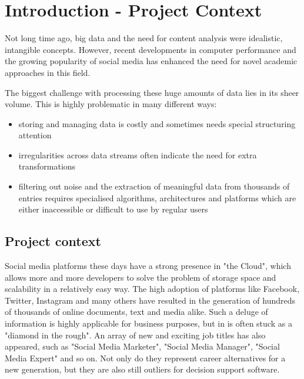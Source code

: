 \documentclass[12pt,a4paper,twoside]{report}
\begin{document}
\newpage

\tableofcontents
\newpage



\chapter{Introduction - Project Context}
\pagestyle{headings}

Not long time ago, big data and the need for content analysis were idealistic, intangible concepts. However, recent developments in computer performance and the growing popularity of social media has enhanced the need for novel academic approaches in this field.

The biggest challenge with processing these huge amounts of data lies in its sheer volume. This is highly problematic in many different ways:

\begin{itemize}
 \item storing and managing data is costly and sometimes needs special structuring attention
\item irregularities across data streams often indicate the need for extra transformations
\item filtering out noise and the extraction of meaningful data from thousands of entries requires specialised algorithms, architectures and platforms which are either inaccessible or difficult to use by regular users
\end{itemize}

\section{Project context}

Social media platforms these days have a strong presence in "the Cloud", which allows more and more developers to solve the problem of storage space and scalability in a relatively easy way. The high adoption of platforms like Facebook, Twitter, Instagram and many others have resulted in the generation of hundreds of thousands of online documents, text and media alike. Such a deluge of information is highly applicable for business purposes, but in is often stuck as a "diamond in the rough". An array of new and exciting job titles has also appeared, such as "Social Media Marketer", "Social Media Manager", "Social Media Expert" and so on. Not only do they represent career alternatives for a new generation, but they are also still outliers for decision support software.
\end{document}
